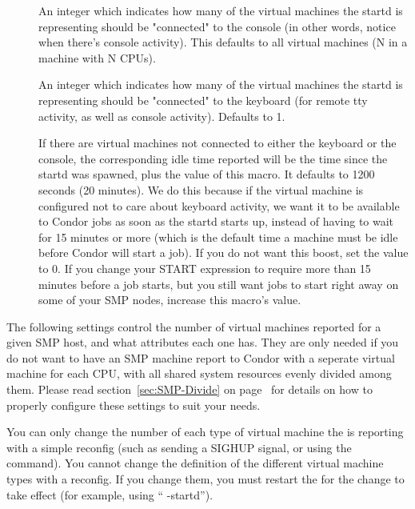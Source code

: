 \begin{description}

\item[] 
\label{param:VirtualMachinesConnectedToConsole}
  An integer which indicates how many of the virtual
  machines the startd is representing should be "connected" to the
  console (in other words, notice when there's console activity).
  This defaults to all virtual machines (N in a machine with N CPUs).

\item[]
\label{param:VirtualMachinesConnectedToKeyboard}
  An integer which indicates how many of the virtual
  machines the startd is representing should be "connected" to the
  keyboard (for remote tty activity, as well as console activity).
  Defaults to 1.

\item[]
\label{param:DisconnectedKeyboardIdleBoost}
  If there are virtual machines not connected to either the keyboard
  or the console, the corresponding idle time reported will be the
  time since the startd was spawned, plus the value of this macro.
  It defaults to 1200 seconds (20 minutes). 
  We do this because if the virtual machine is configured not to care
  about keyboard activity, we want it to be available to Condor jobs
  as soon as the startd starts up, instead of having to wait for 15
  minutes or more (which is the default time a machine must be idle
  before Condor will start a job).
  If you do not want this boost, set the value to 0.  
  If you change your START expression to require more than 15 minutes
  before a job starts, but you still want jobs to start right away on
  some of your SMP nodes, increase this macro's value.

\end{description}

The following settings control the number of virtual machines reported
for a given SMP host, and what attributes each one has.  
They are only needed if you do not want to have an SMP machine report
to Condor with a seperate virtual machine for each CPU, with all
shared system resources evenly divided among them.
Please read section~\ref{sec:SMP-Divide} on
page~\pageref{sec:SMP-Divide} for details on how to properly configure
these settings to suit your needs.

\Note You can only change the number of each type of virtual machine
the  is reporting with a simple reconfig (such as
sending a SIGHUP signal, or using the  command).
You cannot change the definition of the different virtual machine
types with a reconfig.  
If you change them, you must restart the  for the
change to take effect (for example, using ``
-startd'').

